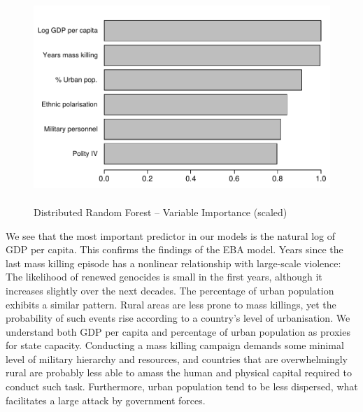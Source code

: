\begin{figure}[h]
\includegraphics[width=.9\textwidth, height=8cm]{images/drf.pdf}
\caption{Distributed Random Forest -- Variable Importance (scaled)}
\label{fig:drfuv}
\end{figure}

We see that the most important predictor in our models is the natural log of GDP per capita. This confirms the findings of the EBA model. Years since the last mass killing episode has a nonlinear relationship with large-scale violence: The likelihood of renewed genocides is small in the first years, although it increases slightly over the next decades. The percentage of urban population exhibits a similar pattern. Rural areas are less prone to mass killings, yet the probability of such events rise according to a country’s level of urbanisation. We understand both GDP per capita and percentage of urban population as proxies for state capacity. Conducting a mass killing campaign demands some minimal level of military hierarchy and resources, and countries that are overwhelmingly rural are probably less able to amass the human and physical capital required to conduct such task. Furthermore, urban population tend to be less dispersed, what facilitates a large attack by government forces. 

\vspace{.5cm}

